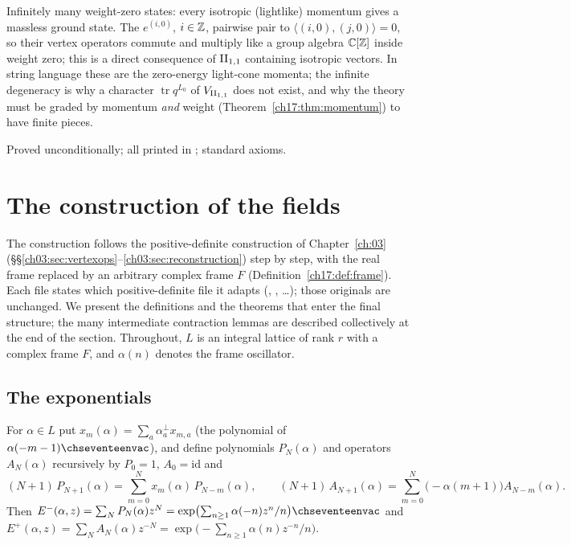 \begin{physics}
Infinitely many weight-zero states: every isotropic (lightlike) momentum gives a massless ground state.  The
$e^{(i,0)}$, $i\in{\mathbb{Z}}$, pairwise pair to $\langle(i,0),(j,0)\rangle=0$, so their vertex operators commute and multiply
like a group algebra ${\mathbb{C}}[{\mathbb{Z}}]$ inside weight zero; this is a direct consequence of ${\mathrm{II}_{1,1}}$ containing isotropic
vectors.  In
string language these are the zero-energy light-cone momenta; the infinite degeneracy is why a character
$\operatorname{tr}q^{L_0}$ of ${V_{\mathrm{II}_{1,1}}}$ does not exist, and why the theory must be graded by momentum
\emph{and} weight (Theorem~\ref{ch17:thm:momentum}) to have finite pieces.
\end{physics}

\begin{status}
Proved unconditionally; all printed in ; standard axioms.
\end{status}

\section{The construction of the fields}\label{ch17:sec:construction}

The construction follows the positive-definite construction of Chapter~\ref{ch:03}
(\S\S\ref{ch03:sec:vertexops}--\ref{ch03:sec:reconstruction}) step by step, with the real frame replaced by
an arbitrary complex frame $F$ (Definition~\ref{ch17:def:frame}).  Each file states which positive-definite
file it adapts (, , …); those originals are unchanged.
We present the definitions and the theorems that enter the final structure; the many intermediate
contraction lemmas are described collectively at the end of the section.  Throughout, $L$ is an integral
lattice of rank $r$ with a complex frame $F$, and $\alpha(n)$ denotes the frame oscillator.

\subsection{The exponentials}

\begin{definition}\label{ch17:def:exponentials}
For $\alpha\in L$ put $x_m(\alpha)=\sum_a\alpha^\perp_ax_{m,a}$ (the polynomial of $\alpha(-m-1)\chseventeenvac$), and define
polynomials $P_N(\alpha)$ and operators $A_N(\alpha)$ recursively by $P_0=1$, $A_0=\mathrm{id}$ and
\begin{equation*}
  (N+1)\,P_{N+1}(\alpha)=\sum_{m=0}^{N}x_m(\alpha)\,P_{N-m}(\alpha),\qquad
  (N+1)\,A_{N+1}(\alpha)=\sum_{m=0}^{N}\bigl(-\alpha(m+1)\bigr)A_{N-m}(\alpha).
\end{equation*}
Then $E^-(\alpha,z)=\sum_NP_N(\alpha)z^N=\exp\bigl(\sum_{n\ge1}\alpha(-n)z^n/n\bigr)\chseventeenvac$ and
$E^+(\alpha,z)=\sum_NA_N(\alpha)z^{-N}=\exp\bigl(-\sum_{n\ge1}\alpha(n)z^{-n}/n\bigr)$.
\end{definition}

